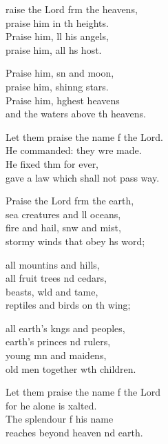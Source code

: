 \settowidth{\versewidth}{Let them praise the name of the Lord. *}
\begin{psalmverse}%
  \begin{patverse}
raise the Lord frm the heavens,\Med\\
    praise him in th heights.\\
Praise him, ll his angels,\Med\\
    praise him, all h\pointup{\i}s host.

Praise him, sn and moon,\Med\\
    praise him, shin\pointup{\i}ng stars.\\
Praise him, h\pointup{\i}ghest heavens\Med\\
    and the waters above th heavens.

Let them praise the name f the Lord.\Med\\
    He commanded: they wre made.\\
He fixed thm for ever,\Med\\
    gave a law which shall not pass way.

Praise the Lord frm the earth,\Med\\
    sea creatures and ll oceans,\\
fire and hail, snw and mist,\Med\\
    stormy winds that obey h\pointup{\i}s word;

all mountins and hills,\Med\\
    all fruit trees nd cedars,\\
beasts, w\pointup{\i}ld and tame,\Med\\
    reptiles and birds on th wing;

all earth’s k\pointup{\i}ngs and peoples,\Med\\
    earth’s princes nd rulers,\\
young mn and maidens,\Med\\
    old men together w\pointup{\i}th children.

Let them praise the name f the Lord\Med\\
    for he alone is xalted.\\
The splendour f his name\Med\\
    reaches beyond heaven nd earth.


\end{patverse}
\end{psalmverse}
